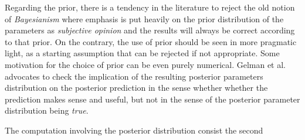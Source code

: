 Regarding the prior, there is a tendency in the literature \cite{Gelman2013,McElreath2015} to reject the old notion of \emph{Bayesianism} where emphasis is put heavily on the prior distribution of the parameters as \emph{subjective opinion} and the results will always be correct according to that prior.
On the contrary, the use of prior should be seen in more pragmatic light, as a starting assumption that can be rejected if not appropriate.
Some motivation for the choice of prior can be even purely numerical. 
Gelman et al.~\cite{Gelman2013} advocates to check the implication of the resulting posterior parameters distribution on the posterior prediction in the sense whether whether the prediction makes sense and useful, but not in the sense of the posterior parameter distribution being \emph{true}.

The computation involving the posterior distribution consist the second 





